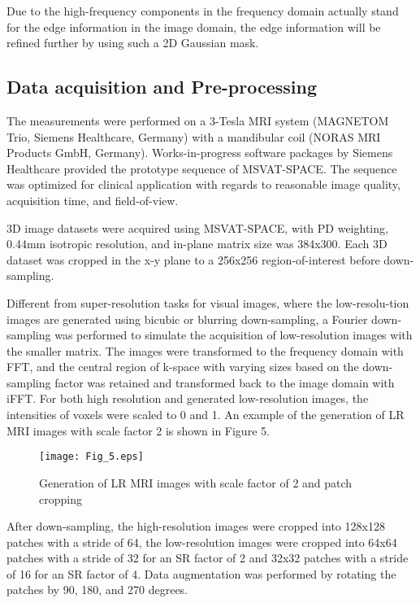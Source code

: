 \documentclass[runningheads]{llncs}
\begin{document}
Due to the high-frequency components in the frequency domain actually stand for the edge information in the image domain, the edge information will be refined further by using such a 2D Gaussian mask.

\subsection{Data acquisition and Pre-processing}

The measurements were performed on a 3-Tesla MRI system (MAGNETOM Trio, Siemens Healthcare, Germany) with a mandibular coil (NORAS MRI Products GmbH, Germany). Works-in-progress software packages by Siemens Healthcare provided the prototype sequence of MSVAT-SPACE. The sequence was optimized for clinical application with regards to reasonable image quality, acquisition time, and field-of-view. 

3D image datasets were acquired using MSVAT-SPACE, with PD weighting, 0.44mm isotropic resolution, and in-plane matrix size was 384x300. Each 3D dataset was cropped in the x-y plane to a 256x256 region-of-interest before down-sampling.  

Different from super-resolution tasks for visual images, where the low-resolu-tion images are generated using bicubic or blurring down-sampling, a Fourier down-sampling was performed to simulate the acquisition of low-resolution images with the smaller matrix. The images were transformed to the frequency domain with FFT, and the central region of k-space with varying sizes based on the down-sampling factor was retained and transformed back to the image domain with iFFT. For both high resolution and generated low-resolution images, the intensities of voxels were scaled to 0 and 1. An example of the generation of LR MRI images with scale factor 2 is shown in Figure 5.

\begin{figure}
\texttt{[image: Fig\_5.eps]}
\caption{Generation of LR MRI images with scale factor of 2 and patch cropping} \label{Fig_5}
\end{figure}

After down-sampling, the high-resolution images were cropped into 128x128 patches with a stride of 64, the low-resolution images were cropped into 64x64 patches with a stride of 32 for an SR factor of 2 and 32x32 patches with a stride of 16 for an SR factor of 4. Data augmentation was performed by rotating the patches by 90, 180, and 270 degrees. 
\end{document}
